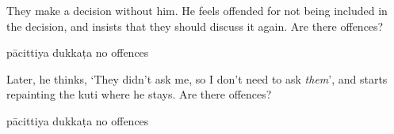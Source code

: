 \begin{exam}{\autoExamName}
\begin{problem*}
\begin{parts}
    \item They make a decision without him. He feels offended for not being
      included in the decision, and insists that they should discuss it again.
      Are there offences?

      \bigskip

      \begin{answers}{3}
        \bChoices
         pācittiya\eAns
         dukkaṭa\eAns
         no offences\eAns
        \eChoices
      \end{answers}
  
    \item Later, he thinks, `They didn't ask me, so I don't need to ask
      \textit{them}', and starts repainting the kuti where he stays.
      Are there offences?

      \bigskip

      \begin{answers}{3}
        \bChoices
         pācittiya\eAns
         dukkaṭa\eAns
         no offences\eAns
        \eChoices
      \end{answers}

    \end{parts}

  \end{problem*}

\end{exam}